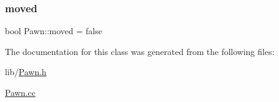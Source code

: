\subsubsection{\texorpdfstring{moved}{moved}}
{\footnotesize\ttfamily bool Pawn\+::moved = false\hspace{0.3cm}{\ttfamily [private]}}



The documentation for this class was generated from the following files\+:\begin{DoxyCompactItemize}
\item 
lib/\hyperlink{_pawn_8h}{Pawn.\+h}\item 
\hyperlink{_pawn_8cc}{Pawn.\+cc}\end{DoxyCompactItemize}
